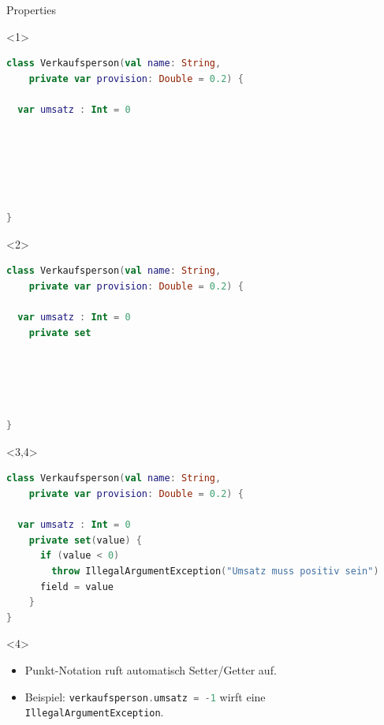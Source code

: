 \documentclass{beamer}
\begin{document}
\begin{frame}[fragile]{Properties}
  \begin{onlyenv}<1>
    \begin{lstlisting}[language=Kotlin, title=Kotlin: Properties, xleftmargin=1em]
class Verkaufsperson(val name: String, 
    private var provision: Double = 0.2) {
            
  var umsatz : Int = 0



      
      
      
}
    \end{lstlisting}
  \end{onlyenv}
  \begin{onlyenv}<2>
    \begin{lstlisting}[language=Kotlin, title=Kotlin: Properties Zugriffsmodifikator, xleftmargin=1em]
class Verkaufsperson(val name: String, 
    private var provision: Double = 0.2) {
      
  var umsatz : Int = 0
    private set





}
    \end{lstlisting}
  \end{onlyenv}
  \begin{onlyenv}<3,4>
    \begin{lstlisting}[language=Kotlin, title=Kotlin: Benutzerdefinierte Zugriffsmethoden, xleftmargin=1em]
class Verkaufsperson(val name: String, 
    private var provision: Double = 0.2) {

  var umsatz : Int = 0
    private set(value) {
      if (value < 0)
        throw IllegalArgumentException("Umsatz muss positiv sein")
      field = value
    }
}
    \end{lstlisting}
  \end{onlyenv}
  \begin{uncoverenv}<4>
    \begin{itemize}
    \item Punkt-Notation ruft automatisch Setter/Getter auf.
    \item Beispiel: \lstinline[language=kotlin]|verkaufsperson.umsatz = -1| wirft eine \texttt{IllegalArgumentException}.
    \end{itemize}
  \end{uncoverenv}
\end{frame}

\end{document}
